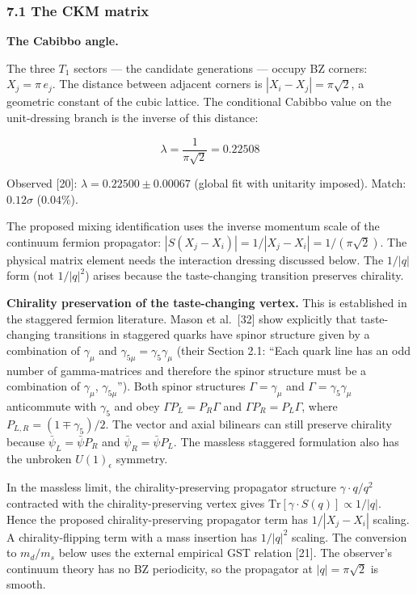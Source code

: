 \documentclass[
]{article}
\begin{document}
\hypertarget{the-ckm-matrix}{%
\subsubsection{7.1 The CKM matrix}\label{the-ckm-matrix}}

\textbf{The Cabibbo angle.}

The three \(T_1\) sectors --- the candidate generations --- occupy BZ
corners: \(X_j = \pi\,e_j\). The distance between adjacent corners is
\(|X_i - X_j| = \pi\sqrt{2}\), a geometric constant of the cubic
lattice. The conditional Cabibbo value on the unit-dressing branch is
the inverse of this distance:

\[\boxed{\lambda = \frac{1}{\pi\sqrt{2}} = 0.22508}\]

Observed {[}20{]}: \(\lambda = 0.22500 \pm 0.00067\) (global fit with
unitarity imposed). Match: \(0.12\sigma\) (\(0.04\%\)).

The proposed mixing identification uses the inverse momentum scale of
the continuum fermion propagator:
\(|S(X_j - X_i)| = 1/|X_j - X_i| = 1/(\pi\sqrt{2})\). The physical
matrix element needs the interaction dressing discussed below. The
\(1/|q|\) form (not \(1/|q|^2\)) arises because the taste-changing
transition preserves chirality.

\textbf{Chirality preservation of the taste-changing vertex.} This is
established in the staggered fermion literature. Mason et al.~{[}32{]}
show explicitly that taste-changing transitions in staggered quarks have
spinor structure given by a combination of \(\gamma_\mu\) and
\(\gamma_{5\mu} = \gamma_5\gamma_\mu\) (their Section 2.1: ``Each quark
line has an odd number of gamma-matrices and therefore the spinor
structure must be a combination of \(\gamma_\mu\), \(\gamma_{5\mu}\)'').
Both spinor structures \(\Gamma = \gamma_\mu\) and
\(\Gamma = \gamma_5\gamma_\mu\) anticommute with \(\gamma_5\) and obey
\(\Gamma P_L = P_R\Gamma\) and \(\Gamma P_R=P_L\Gamma\), where
\(P_{L,R}=(1\mp\gamma_5)/2\). The vector and axial bilinears can still
preserve chirality because \(\bar\psi_L=\bar\psi P_R\) and
\(\bar\psi_R=\bar\psi P_L\). The massless staggered formulation also has
the unbroken \(U(1)_\epsilon\) symmetry.

In the massless limit, the chirality-preserving propagator structure
\(\gamma \cdot q / q^2\) contracted with the chirality-preserving vertex
gives \(\text{Tr}[\gamma \cdot S(q)] \propto 1/|q|\). Hence the proposed
chirality-preserving propagator term has \(1/|X_j-X_i|\) scaling. A
chirality-flipping term with a mass insertion has \(1/|q|^2\) scaling.
The conversion to \(m_d/m_s\) below uses the external empirical GST
relation {[}21{]}. The observer's continuum theory has no BZ
periodicity, so the propagator at \(|q| = \pi\sqrt{2}\) is smooth.
\end{document}
